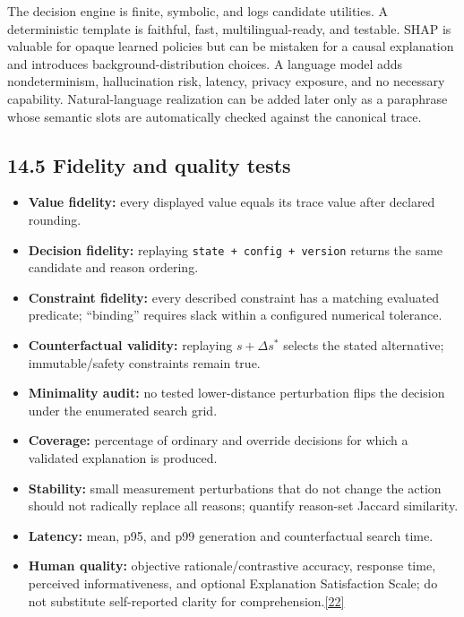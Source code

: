 \documentclass[
  english,
  11pt,
  a4paper,
]{article}
\providecommand{\tightlist}{%
  \setlength{\itemsep}{0pt}\setlength{\parskip}{0pt}}
\begin{document}
The decision engine is finite, symbolic, and logs candidate utilities. A
deterministic template is faithful, fast, multilingual-ready, and
testable. SHAP is valuable for opaque learned policies but can be
mistaken for a causal explanation and introduces background-distribution
choices. A language model adds nondeterminism, hallucination risk,
latency, privacy exposure, and no necessary capability. Natural-language
realization can be added later only as a paraphrase whose semantic slots
are automatically checked against the canonical trace.

\subsection{14.5 Fidelity and quality
tests}\label{fidelity-and-quality-tests}

\begin{itemize}
\tightlist
\item
  \textbf{Value fidelity:} every displayed value equals its trace value
  after declared rounding.
\item
  \textbf{Decision fidelity:} replaying
  \texttt{state\ +\ config\ +\ version} returns the same candidate and
  reason ordering.
\item
  \textbf{Constraint fidelity:} every described constraint has a
  matching evaluated predicate; ``binding'' requires slack within a
  configured numerical tolerance.
\item
  \textbf{Counterfactual validity:} replaying \(s+\Delta s^*\) selects the
  stated alternative; immutable/safety constraints remain true.
\item
  \textbf{Minimality audit:} no tested lower-distance perturbation flips
  the decision under the enumerated search grid.
\item
  \textbf{Coverage:} percentage of ordinary and override decisions for
  which a validated explanation is produced.
\item
  \textbf{Stability:} small measurement perturbations that do not change
  the action should not radically replace all reasons; quantify
  reason-set Jaccard similarity.
\item
  \textbf{Latency:} mean, p95, and p99 generation and counterfactual
  search time.
\item
  \textbf{Human quality:} objective rationale/contrastive accuracy,
  response time, perceived informativeness, and optional Explanation
  Satisfaction Scale; do not substitute self-reported clarity for
  comprehension.\hyperref[source-22]{[22]}
\end{itemize}
\end{document}
